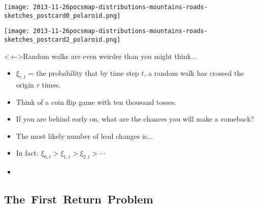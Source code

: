 \begin{frame}
  \texttt{[image: 2013-11-26pocsmap-distributions-mountains-roads-sketches\_postcard0\_polaroid.png]}
\end{frame}

\begin{frame}
  \texttt{[image: 2013-11-26pocsmap-distributions-mountains-roads-sketches\_postcard2\_polaroid.png]}
\end{frame}


\begin{frame}

  \begin{block}<+->{Random walks are even weirder than you might think...}
    \begin{itemize}
    \item<+->
      $\xi_{r,t}$ = the probability that by time step $t$,
      a random walk has crossed the origin $r$ times.
    \item<+->
      Think of a coin flip game with ten thousand tosses.
    \item<+->
      If you are behind early on, what are the chances you
      will make a comeback?
    \item<+->
      The most likely number of lead changes is...  
    \item<+->
      In fact:
      $\xi_{0,t} > \xi_{1,t} > \xi_{2,t} > \cdots $
    \item<+->
    \end{itemize}
  \end{block}

\end{frame}




\subsection{The\ First\ Return\ Problem}

